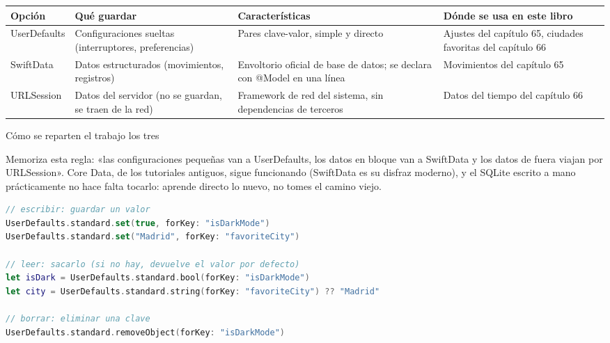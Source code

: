 


\begin{center}
\begin{tabularx}{\linewidth}{|X|X|X|X|}
\hline
\textbf{Opción} & \textbf{Qué guardar} & \textbf{Características} & \textbf{Dónde se usa en este libro} \tabularnewline
\hline
UserDefaults & Configuraciones sueltas (interruptores, preferencias) & Pares clave-valor, simple y directo & Ajustes del capítulo 65, ciudades favoritas del capítulo 66 \tabularnewline
SwiftData & Datos estructurados (movimientos, registros) & Envoltorio oficial de base de datos; se declara con @Model en una línea & Movimientos del capítulo 65 \tabularnewline
URLSession & Datos del servidor (no se guardan, se traen de la red) & Framework de red del sistema, sin dependencias de terceros & Datos del tiempo del capítulo 66 \tabularnewline
\hline
\end{tabularx}
\end{center}

\begin{center}\small\color{gray}Cómo se reparten el trabajo los tres\end{center}

Memoriza esta regla: «las configuraciones pequeñas van a UserDefaults, los datos en bloque van a SwiftData y los datos de fuera viajan por URLSession». Core Data, de los tutoriales antiguos, sigue funcionando (SwiftData es su disfraz moderno), y el SQLite escrito a mano prácticamente no hace falta tocarlo: aprende directo lo nuevo, no tomes el camino viejo.


\begin{lstlisting}[language=Swift]
// escribir: guardar un valor
UserDefaults.standard.set(true, forKey: "isDarkMode")
UserDefaults.standard.set("Madrid", forKey: "favoriteCity")

// leer: sacarlo (si no hay, devuelve el valor por defecto)
let isDark = UserDefaults.standard.bool(forKey: "isDarkMode")
let city = UserDefaults.standard.string(forKey: "favoriteCity") ?? "Madrid"

// borrar: eliminar una clave
UserDefaults.standard.removeObject(forKey: "isDarkMode")
\end{lstlisting}

